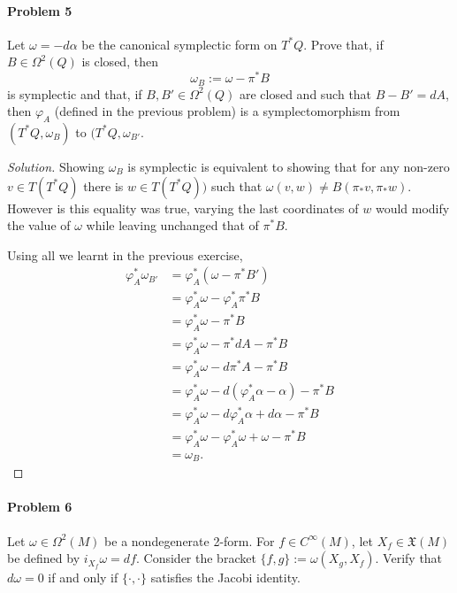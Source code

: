 \paragraph{Problem 5} Let $\omega=-d\alpha$ be the canonical symplectic form on  $T^*Q$. Prove that, if $B\in\Omega^{2}(Q)$ is closed, then
 \[\omega_B:=\omega-\pi^*B\]
 is symplectic and that, if $B,B'\in\Omega^{2}(Q)$ are closed and such that $B-B'=dA$, then $\varphi_A$ (defined in the previous problem) is a symplectomorphism from $(T^*Q,\omega_B)$ to $(T^* Q,\omega_{B'}$.

 \begin{proof}[Solution]\leavevmode
	Showing $\omega_B$ is symplectic is equivalent to showing that for any non-zero $v \in T(T^* Q)$ there is $w\in T(T^*Q))$ such that $\omega(v,w)\neq B(\pi_*v,\pi_*w)$. However is this equality was true, varying the last coordinates of $w$ would modify the value of $\omega$ while leaving unchanged that of $\pi^*B$.

 	Using all we learnt in the previous exercise,
	\begin{align*}
		\varphi^*_A \omega_{B'}&=\varphi^*_A(\omega-\pi^*B')\\
		&=\varphi^*_A\omega-\varphi^*_A\pi^*B\\
		&=\varphi^*_A\omega-\pi^*B\\
		&=\varphi^*_A\omega-\pi^*dA-\pi^*B\\
		&=\varphi^*_A\omega-d\pi^*A-\pi^*B\\
		&=\varphi^*_A\omega-d(\varphi^*_A\alpha-\alpha)-\pi^*B\\
		&=\varphi^*_A\omega-d\varphi^*_A\alpha+d\alpha-\pi^*B\\
		&=\varphi^*_A\omega-\varphi^*_A\omega+\omega-\pi^*B\\
		&=\omega_B.
	\end{align*}
 \end{proof}

\paragraph{Problem 6} Let $\omega\in\Omega^2(M)$ be a nondegenerate 2-form. For $f\in C^\infty(M)$, let $X_f\in\mathfrak{X}(M)$ be defined by $i_{X_{f}}\omega=df$. Consider the bracket $\{f,g\}:=\omega(X_g,X_f)$. Verify that $d\omega=0$ if and only if $\{\cdot ,\cdot \}$ satisfies the Jacobi identity.

